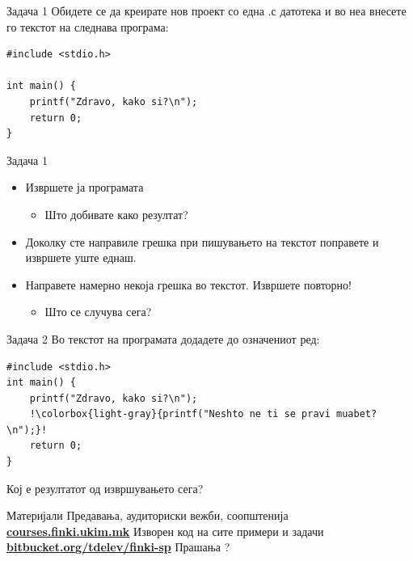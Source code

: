 \begin{frame}[fragile]{Задача 1}
Обидете се да креирате нов проект со една .с датотека и во неа внесете го
текстот на следнава програма:
\begin{lstlisting}
#include <stdio.h>

int main() {
    printf("Zdravo, kako si?\n");
    return 0;
}
\end{lstlisting}

\end{frame}

\begin{frame}{Задача 1}
\begin{itemize}
  \item Извршете ја програмата
\begin{itemize}
  \item Што добивате како резултат?
\end{itemize}
  \item Доколку сте направиле грешка при пишувањето на текстот поправете и
  извршете уште еднаш. 
  \item Направете намерно некоја грешка во текстот. Извршете повторно!
\begin{itemize}
  \item Што се случува сега?
\end{itemize}
\end{itemize}
\end{frame}

\begin{frame}[fragile]{Задача 2}
Во текстот на програмата додадете до означениот ред:
\begin{lstlisting}[escapechar=!]
#include <stdio.h>
int main() {
    printf("Zdravo, kako si?\n");
    !\colorbox{light-gray}{printf("Neshto ne ti se pravi muabet?\n");}!
    return 0;
}
\end{lstlisting}
Кој е резултатот од извршувањето сега?
\end{frame}

\begin{frame}{Материјали}{}
    Предавања, аудиториски вежби, соопштенија\\
    \href{http://courses.finki.ukim.mk/}{\textbf{courses.finki.ukim.mk}}
    \vfill
    Изворен код на сите примери и задачи\\
    \href{http://bitbucket.org/tdelev/finki-krs/}{\textbf{bitbucket.org/tdelev/finki-sp}}
    \vfill
    {\Huge Прашања ?}
\end{frame}
    















